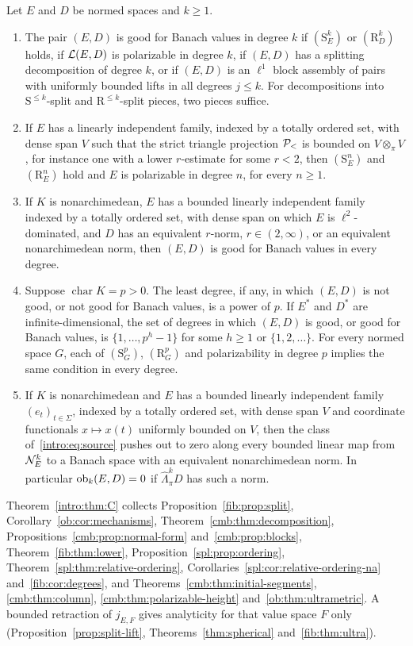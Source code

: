 \begin{introtheorem}\label{intro:thm:C}
Let $E$ and $D$ be normed spaces and $k\ge1$.
\begin{enumerate}
\item The pair $(E,D)$ is good for Banach values in degree $k$ if $(\mathrm S^k_E)$ or $(\mathrm R^k_D)$ holds, if
$\mathcal L(E,D)$ is polarizable in degree $k$, if $(E,D)$ has a splitting decomposition of degree $k$, or if $(E,D)$ is an
$\ell^1$ block assembly of pairs with uniformly bounded lifts in all degrees $j\le k$. For decompositions into
$\mathrm S^{\le k}$-split and $\mathrm R^{\le k}$-split pieces, two pieces suffice.
\item If $E$ has a linearly independent family, indexed by a totally ordered set, with dense span $V$ such that the
strict triangle projection $\mathcal P_<$ is bounded on $V\otimes_\pi V$, for instance one with a lower $r$-estimate for some
$r<2$, then $(\mathrm S^n_E)$ and $(\mathrm R^n_E)$ hold and $E$ is polarizable in degree $n$, for every $n\ge1$.
\item If $K$ is nonarchimedean, $E$ has a bounded linearly independent family indexed by a totally ordered set, with
dense span on which $E$ is $\ell^2$-dominated, and $D$ has an equivalent $r$-norm, $r\in(2,\infty)$, or an
equivalent nonarchimedean norm, then $(E,D)$ is good for Banach values in every degree.
\item Suppose $\operatorname{char}K=p>0$. The least degree, if any, in which $(E,D)$ is not good, or not good for
Banach values, is a power of $p$. If $E^*$ and $D^*$ are infinite-dimensional, the set of degrees in which $(E,D)$ is
good, or good for Banach values, is $\{1,\dots,p^h-1\}$ for some $h\ge1$ or $\{1,2,\dots\}$. For every normed space
$G$, each of $(\mathrm S^p_G)$, $(\mathrm R^p_G)$ and polarizability in degree $p$ implies the same condition in every
degree.
\item If $K$ is nonarchimedean and $E$ has a bounded linearly independent family $(e_t)_{t\in\Sigma}$, indexed by a
totally ordered set, with dense span $V$ and coordinate functionals $x\mapsto x(t)$ uniformly bounded on $V$, then the
class of~\eqref{intro:eq:source} pushes out to zero along every bounded linear map from $\mathcal N^k_E$ to a Banach space with
an equivalent nonarchimedean norm. In particular $\operatorname{ob}_k(E,D)=0$ if $\widehat\Lambda^k_\pi D$ has such a norm.
\end{enumerate}
\end{introtheorem}

Theorem~\ref{intro:thm:C} collects Proposition~\ref{fib:prop:split}, Corollary~\ref{ob:cor:mechanisms},
Theorem~\ref{cmb:thm:decomposition}, Propositions~\ref{cmb:prop:normal-form} and~\ref{cmb:prop:blocks},
Theorem~\ref{fib:thm:lower}, Proposition~\ref{spl:prop:ordering}, Theorem~\ref{spl:thm:relative-ordering},
Corollaries~\ref{spl:cor:relative-ordering-na} and~\ref{fib:cor:degrees}, and Theorems~\ref{cmb:thm:initial-segments},
\ref{cmb:thm:column}, \ref{cmb:thm:polarizable-height} and~\ref{ob:thm:ultrametric}. A bounded retraction of $j_{E,F}$
gives analyticity for that value space $F$ only (Proposition~\ref{prop:split-lift}, Theorems~\ref{thm:spherical}
and~\ref{fib:thm:ultra}).


